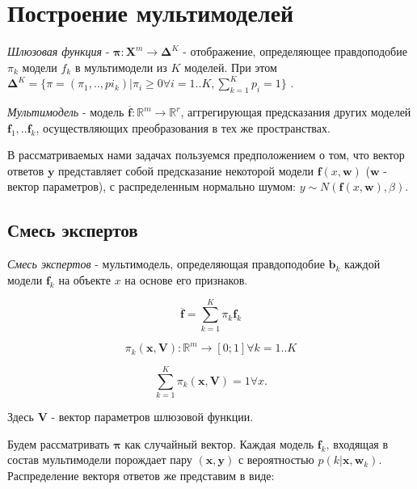 \documentclass[12pt,twoside]{article}
\begin{document}
\section{Построение мультимоделей}

\begin{Def}
     \emph{Шлюзовая функция} - $\boldsymbol{\pi}: \mathbf{X}^m \rightarrow \boldsymbol{\Delta}^K$  - отображение, определяющее правдоподобие $\pi_k$ модели $f_k$ в мультимодели из $K$ моделей. При этом $\boldsymbol{\Delta}^K =
 \{\pi = (\pi_1, .. , pi_k)  | \pi_i \geq 0 \forall i = 1 .. K, \sum\limits_{k = 1}^K p_i = 1 \}$ .

\end{Def}

\begin{Def}
     \emph{Мультимодель} - модель $\mathbf{\overline{f}}: \mathbb{R}^m \rightarrow \mathbb{R}^r$, аггрегирующая предсказания других моделей $\mathbf{f}_1, .. \mathbf{f}_k$, осуществляющих преобразования в тех же пространствах.
\end{Def}

В рассматриваемых нами задачах пользуемся предположением о  том, что вектор ответов $\mathbf{y}$ представляет собой предсказание некоторой модели $\mathbf{f}(x, \mathbf{w})$ ($\mathbf{w}$ - вектор параметров), с распределенным нормально шумом: $y \sim N(\mathbf{f}(x, \mathbf{w}), \beta)$.

\subsection{Смесь экспертов}

\begin{Def}
     \emph{Смесь экспертов} - мультимодель, определяющая правдоподобие
 $\boldsymbol{b}_k$ каждой модели $\mathbf{f}_k$ на объекте $x$ на основе его признаков.
\end{Def}

$$ \overline{\mathbf{f}} = \sum\limits_{k=1}^K \pi_k \mathbf{f}_k$$

$$\pi_k (\mathbf{x}, \mathbf{V}): \mathbb{R}^m \rightarrow [0; 1] \forall k = 1..K$$

$$\sum\limits_{k=1}^K \pi_k(\mathbf{x}, \mathbf{V}) = 1 \forall x.$$

Здесь $\mathbf{V}$ - вектор параметров шлюзовой функции.

Будем рассматривать $\boldsymbol{\pi}$ как случайный вектор. Каждая модель $\mathbf{f}_k$, входящая в состав мультимодели порождает пару $(\mathbf{x}, \mathbf{y})$ с вероятностью $p(k | \mathbf{x}, \mathbf{w}_k)$. Распределение векторя ответов же представим в виде:
\end{document}
